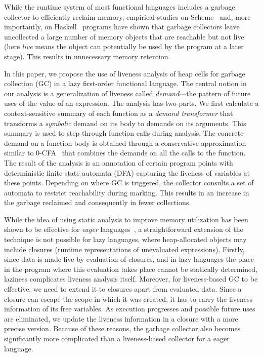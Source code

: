 \documentclass[9pt,preprint,letter,nonatbib]{sigplanconf}
\newcommand{\added}[1]{#1}
\newcommand{\todelete}[1]{}%
\begin{document}
While  the runtime  system  of most  functional  languages includes  a
garbage collector to efficiently  reclaim memory, empirical studies on
Scheme~\cite{karkare06effectiveness}   and,   more   importantly,   on
Haskell~\cite{rojemo96lag} programs have shown that garbage collectors
leave uncollected a large number  of memory objects that are reachable
but not live (here {\em live} means the object can potentially be used
by the program at a  later stage).  This results in unnecessary memory
retention.

In this paper,  we propose the use of liveness  analysis of heap cells
for garbage collection (GC) in a lazy first-order functional language.
The central  notion in  our analysis is  a generalization  of liveness
called {\em  demand}---the pattern of future  uses of the value  of an
expression.   The  analysis  has  two parts.   We  first  calculate  a
context-sensitive  summary   of  each   function  as  a   {\em  demand
  transformer} that transforms a {\em  symbolic} demand on its body to
demands  on its  arguments.   This  summary is  used  to step  through
function calls  during analysis.   The concrete  demand on  a function
body  is  obtained through  a  conservative  approximation similar  to
0-CFA~\cite{Shivers:1988} that  combines the demands on  all the calls
to  the function.   The result  of the  analysis is  an annotation  of
certain program points with  deterministic finite-state automata (DFA)
capturing the  liveness of  variables at  these points.   Depending on
where GC  is triggered, the  collector consults  a set of  automata to
restrict reachability during marking.  This  results in an increase in
the garbage reclaimed and consequently in fewer collections.


\added{While  the idea  of  using static  analysis  to improve  memory
  utilization  has  been  shown  to   be  effective  for  {\em  eager}
  languages~\cite{asati14lgc,       HofmannJ03,       inoue88analysis,
    lee05static}, a straightforward extension  of the technique is not
  possible  for  lazy  languages,  where  heap-allocated  objects  may
  include   closures    (runtime   representations    of   unevaluated
  expressions).   }   \todelete{Designing  a  liveness  based  garbage
  collector   for  lazy   languages  poses   significant  challenges.}
Firstly, since  data is made  live by  evaluation of closures,  and in
lazy languages  the place in  the program where this  evaluation takes
place cannot  be statically determined, laziness  complicates liveness
analysis itself.  Moreover, for liveness-based  GC to be effective, we
need to  extend it  to closures  apart from  evaluated data.   Since a
closure can escape the scope in which  it was created, it has to carry
the  liveness  information  of   its  free  variables.   As  execution
progresses  and possible  future uses  are eliminated,  we update  the
liveness  information  in  a  closure with  a  more  precise  version.
Because  of   these  reasons,  the  garbage   collector  also  becomes
significantly more  complicated than a liveness-based  collector for a
eager language.
\end{document}
